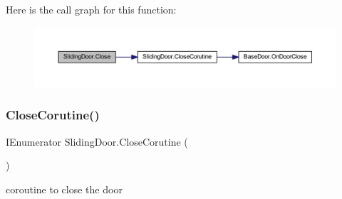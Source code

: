 Here is the call graph for this function\+:
\nopagebreak
\begin{figure}[H]
\begin{center}
\leavevmode
\includegraphics[width=350pt]{class_sliding_door_a22d2e8580503b045da48510214599746_cgraph}
\end{center}
\end{figure}
\mbox{\label{class_sliding_door_adcfa4000b6eafa6ec8b6ec335dbd5efe}} 
\subsubsection{\texorpdfstring{Close\+Corutine()}{CloseCorutine()}}
{\footnotesize\ttfamily I\+Enumerator Sliding\+Door.\+Close\+Corutine (\begin{DoxyParamCaption}{ }\end{DoxyParamCaption})\hspace{0.3cm}{\ttfamily [private]}}



coroutine to close the door 

